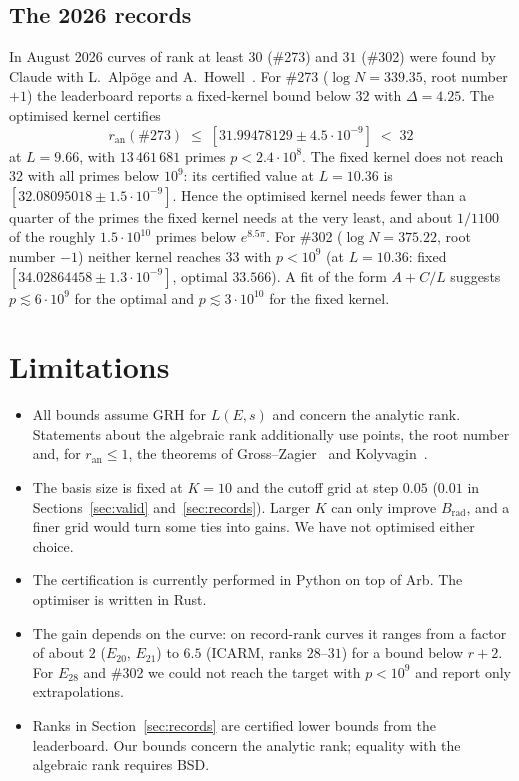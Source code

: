 \documentclass[11pt]{amsart}
\theoremstyle{remark}
\theoremstyle{definition}
\newcommand{\ran}{r_{\mathrm{an}}}
\begin{document}
\subsection*{The 2026 records}
In August 2026 curves of rank at least $30$ (\#273) and $31$ (\#302) were found by Claude with L.~Alpöge and A.~Howell~\cite{ICARM}. For \#273 ($\log N=339.35$, root number $+1$) the leaderboard reports a fixed-kernel bound below $32$ with $\Delta=4.25$. The optimised kernel certifies
\[
\ran(\#273)\;\le\;[31.99478129\pm4.5\cdot10^{-9}]\;<\;32
\]
at $L=9.66$, with $13\,461\,681$ primes $p<2.4\cdot10^8$. The fixed kernel does not reach $32$ with all primes below $10^9$: its certified value at $L=10.36$ is $[32.08095018\pm1.5\cdot10^{-9}]$. Hence the optimised kernel needs fewer than a quarter of the primes the fixed kernel needs at the very least, and about $1/1100$ of the roughly $1.5\cdot10^{10}$ primes below $e^{8.5\pi}$. For \#302 ($\log N=375.22$, root number $-1$) neither kernel reaches $33$ with $p<10^9$ (at $L=10.36$: fixed $[34.02864458\pm1.3\cdot10^{-9}]$, optimal $33.566$). A fit of the form $A+C/L$ suggests $p\lesssim 6\cdot10^9$ for the optimal and $p\lesssim3\cdot10^{10}$ for the fixed kernel.

\section{Limitations}
\begin{itemize}
\item All bounds assume GRH for $L(E,s)$ and concern the analytic rank. Statements about the algebraic rank additionally use points, the root number and, for $\ran\le1$, the theorems of Gross--Zagier~\cite{GZ} and Kolyvagin~\cite{Kolyvagin}.
\item The basis size is fixed at $K=10$ and the cutoff grid at step $0.05$ ($0.01$ in Sections~\ref{sec:valid} and~\ref{sec:records}). Larger $K$ can only improve $B_{\mathrm{rad}}$, and a finer grid would turn some ties into gains. We have not optimised either choice.
\item The certification is currently performed in Python on top of Arb. The optimiser is written in Rust.
\item The gain depends on the curve: on record-rank curves it ranges from a factor of about $2$ ($E_{20}$, $E_{21}$) to $6.5$ (ICARM, ranks $28$--$31$) for a bound below $r+2$. For $E_{28}$ and \#302 we could not reach the target with $p<10^9$ and report only extrapolations.
\item Ranks in Section~\ref{sec:records} are certified lower bounds from the leaderboard. Our bounds concern the analytic rank; equality with the algebraic rank requires BSD.
\end{itemize}
\end{document}

